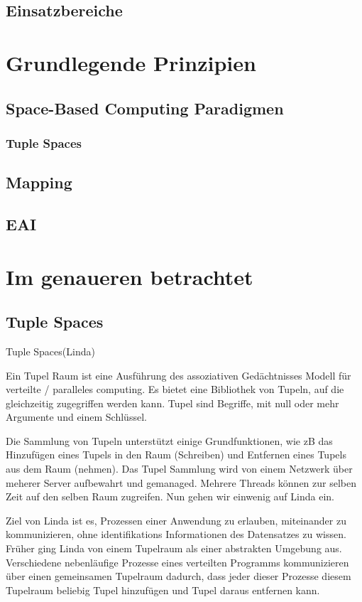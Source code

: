 \documentclass[a4paper,12pt]{scrreprt}
\begin{document}
	\section{Einsatzbereiche}
		
\chapter{Grundlegende Prinzipien}
	\section{Space-Based Computing Paradigmen}
		\subsection{Tuple Spaces}
			
		
	\section{Mapping}
		
	\section{EAI}
		
\chapter{Im genaueren betrachtet}
	\section{Tuple Spaces}
		Tuple Spaces(Linda)
		
		Ein Tupel Raum ist eine Ausführung des assoziativen Gedächtnisses Modell für verteilte / paralleles computing. Es bietet eine Bibliothek von Tupeln, auf  die gleichzeitig zugegriffen werden kann. Tupel sind Begriffe, mit null oder mehr Argumente und einem Schlüssel.
		
		Die Sammlung von Tupeln unterstützt einige Grundfunktionen, wie zB das Hinzufügen eines Tupels in den Raum (Schreiben) und Entfernen eines Tupels aus dem Raum (nehmen). Das Tupel Sammlung wird von einem Netzwerk über meherer Server aufbewahrt und gemanaged. Mehrere Threads können  zur selben Zeit auf den selben Raum zugreifen.
		Nun gehen wir einwenig auf Linda ein.
		
		Ziel von Linda ist es, Prozessen einer Anwendung zu erlauben, miteinander zu kommunizieren, ohne identifikations Informationen des Datensatzes zu wissen. Früher ging Linda  von einem Tupelraum  als einer abstrakten Umgebung aus. Verschiedene nebenläufige Prozesse eines verteilten Programms kommunizieren über einen gemeinsamen Tupelraum dadurch, dass jeder dieser Prozesse diesem Tupelraum beliebig Tupel hinzufügen und Tupel daraus entfernen kann.
		
\end{document}
